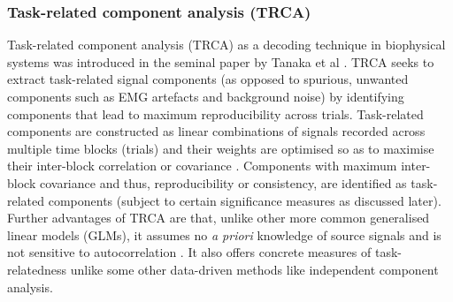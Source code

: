 \subsubsection{Task-related component analysis (TRCA)}
\label{section:trca-c2}
Task-related component analysis (TRCA) as a decoding technique in biophysical systems was introduced in the seminal paper by Tanaka et al \cite{tanaka-trca}. TRCA seeks to extract task-related signal components (as opposed to spurious, unwanted components such as EMG artefacts and background noise) by identifying components that lead to maximum reproducibility across trials. Task-related components are constructed as linear combinations of signals recorded across multiple time blocks (trials) and their weights are optimised so as to maximise their inter-block correlation or covariance \cite{tanaka-trca}. Components with maximum inter-block covariance and thus, reproducibility or consistency, are identified as task-related components (subject to certain significance measures as discussed later). Further advantages of TRCA are that, unlike other more common generalised linear models (GLMs), it assumes no \textit{a priori} knowledge of source signals and is not sensitive to autocorrelation \cite{tanaka-trca}. It also offers concrete measures of task-relatedness unlike some other data-driven methods like independent component analysis.

